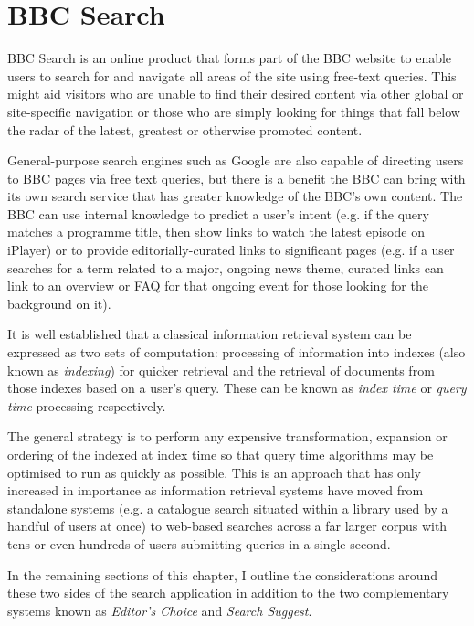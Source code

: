 \documentclass[10pt,a4paper]{report}
\begin{document}
\section{BBC Search}

BBC Search is an online product that forms part of the BBC website
to enable users to search for and navigate all areas of the site using
free-text queries. This might aid visitors who are unable to find their desired
content via other global or site-specific navigation or those who are simply
looking for things that fall below the radar of the latest, greatest or
otherwise promoted content.

General-purpose search engines such as Google are also capable of directing
users to BBC pages via free text queries, but there is a benefit the BBC
can bring with its own search service that has greater knowledge of the
BBC's own content. The BBC can use internal knowledge to predict a user's
intent (e.g. if the query matches a programme title, then show links to watch
the latest episode on iPlayer) or to provide editorially-curated
links to significant pages (e.g. if a user searches for a term
related to a major, ongoing news theme, curated links can
link to an overview or FAQ for that ongoing event for those
looking for the background on it).

It is well established that a classical information retrieval system
can be expressed as two sets of computation: processing of information
into indexes (also known as \emph{indexing}) for quicker retrieval
and the retrieval of documents from those indexes based on a user's
query. These can be known as \emph{index time} or \emph{query time}
processing respectively.

The general strategy is to perform
any expensive transformation, expansion or ordering of the indexed
at index time so that query time algorithms may be optimised to
run as quickly as possible. This is an approach that has only
increased in importance as information retrieval systems have moved
from standalone systems (e.g. a catalogue search situated within
a library used by a handful of users at once) to web-based
searches across a far larger corpus with tens or even hundreds of
users submitting queries in a single second.

In the remaining sections of this chapter, I outline the considerations
around these two sides of the search application in addition to the
two complementary systems known as \emph{Editor's Choice} and
\emph{Search Suggest}.
\end{document}
